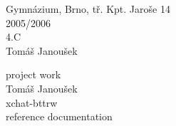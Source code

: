 \noindent{}Gymn\'azium, Brno, t\v{r}. Kpt. Jaro\v{s}e 14\\
2005/2006\\
4.C\\
Tom\'a\v{s} Janou\v{s}ek
\vspace*{7cm}
\begin{center}
\Large project work \\
\LARGE Tom\'a\v{s} Janou\v{s}ek \\[1mm]
\huge xchat-bttrw\\[2mm]
\Large reference documentation
\end{center}
